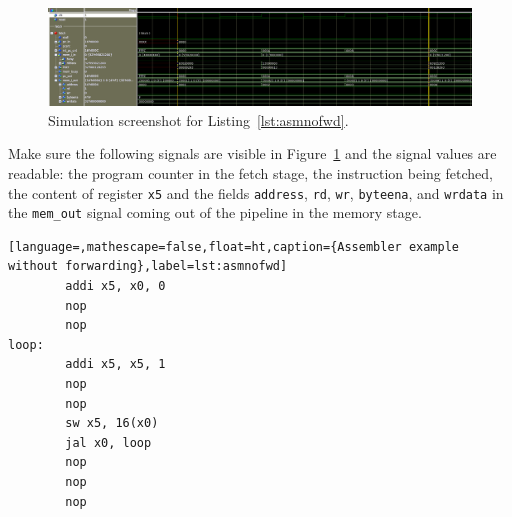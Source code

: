 \documentclass[11pt,a4paper,titlepage,oneside]{article}
\begin{document}
\maketitle


\begin{figure}[ht!]
  \centering
  \includegraphics[width=1.0\linewidth]{fig/fetch_0_015_to_0_045.png}
  \caption{Simulation screenshot for Listing~\ref{lst:asmnofwd}.}
  \label{fig:sim}
\end{figure}

Make sure the following signals are visible in Figure~\ref{fig:sim} and the 
signal values are readable:
the program counter in the fetch stage, the instruction being fetched, the 
content of register \texttt{x5} and the fields \texttt{address}, \texttt{rd}, 
\texttt{wr}, \texttt{byteena}, and \texttt{wrdata} in the \texttt{mem\_out} 
signal coming out of the pipeline in the memory stage.

\begin{lstlisting}[language=,mathescape=false,float=ht,caption={Assembler example without forwarding},label=lst:asmnofwd]
        addi x5, x0, 0
        nop
        nop
loop:
        addi x5, x5, 1
        nop
        nop
        sw x5, 16(x0)
        jal x0, loop
        nop
        nop
        nop
\end{lstlisting}
\end{document}
